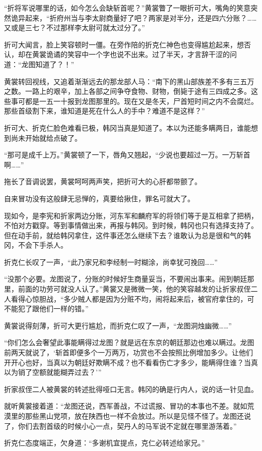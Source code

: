 “折将军说哪里的话，如今怎么会缺斩首呢？”黄裳瞥了一眼折可大，嘴角的笑意突然诡异起来，“折府州当与李太尉商量好了吧？两家是对半分，还是四六分账？……又或是三七？不过那样李太尉可就太过分了。”

折可大闻言，脸上笑容顿时一僵。在旁作陪的折克仁神色也变得尴尬起来，想否认，却在黄裳诡谲的笑容中一个字也说不出来。过了半天，才言辞干涩的问道：“龙图知道了？！”

黄裳转回视线，又追着渐渐远去的那龙部人马：“南下的黑山部族差不多有三五万之数。一路上的艰辛，加上各部之间争夺食物、财物，倒毙于途有三四成之多。这些事可都是一五一十报到龙图那里的。现在又是冬天，尸首短时间之内不会腐烂。那些首级割下来，谁知道是死在什么人的手中？难道不是这样？”

折可大、折克仁脸色难看已极，韩冈当真是知道了。本以为还能多瞒两日，谁能想到尚未开始就给点破了。

“那可是成千上万。”黄裳顿了一下，唇角又翘起，“少说也要超过一万。一万斩首啊……”

拖长了音调说罢，黄裳呵呵两声笑，把折可大的心肝都带颤了。

自来冒功没有这般肆无忌惮的，真要给揪住，罪名可就大了。

现如今，是李宪和折家两边分账，河东军和麟府军的将领们等于是互相拿了把柄，不怕对方戳穿。等到事情做出来，再报与韩冈。到时候，韩冈也只有选择支持了。但在动手前，就给韩冈拿住，这件事还怎么继续下去？谁敢认为总是很和气的韩冈，不会下手杀人。

折克仁长叹了一声，“此乃家兄和李经制一时糊涂，尚幸犹可挽回……”

“没那个必要。龙图说了，分账的时候好生商量妥当，不要闹出事来。闹到朝廷那里，前面的功劳可就没人认了。”黄裳又是微微一笑，他的笑容越发的让折家叔侄二人看得心惊胆战，“多少贼人都是因为分赃不均，闹将起来后，被官府拿住的，可不能犯了跟他们一样的错。”

黄裳说得刻薄，折可大更行尴尬，而折克仁叹了一声，“龙图洞烛幽微……”

“你们怎么会奢望此事能瞒得过龙图？就是远在东京的朝廷那边也难以瞒过。龙图前两天就说了，‘斩首即便多个一万两万，功赏也不会按照比例增加多少。让他们开开心也好，当真以为朝廷好欺瞒不成？也不看看伤亡才多少，能瞒得住谁？当真以为销了空额就能糊弄过去？’”

折家叔侄二人被黄裳的转述批得哑口无言。韩冈的确是行内人，说的话一针见血。

就听黄裳接着道：“龙图还说，西军善战，不过谎报、冒功的本事也不差。就如荒漠里的那些黑山党项，放在陕西也一样不会放过。所以是见怪不怪了。龙图还说了，你们去割首级的时候小心一点，契丹人的马军说不定就在哪里游荡着。”

折克仁态度端正，欠身道：“多谢机宜提点，克仁必转述给家兄。”

